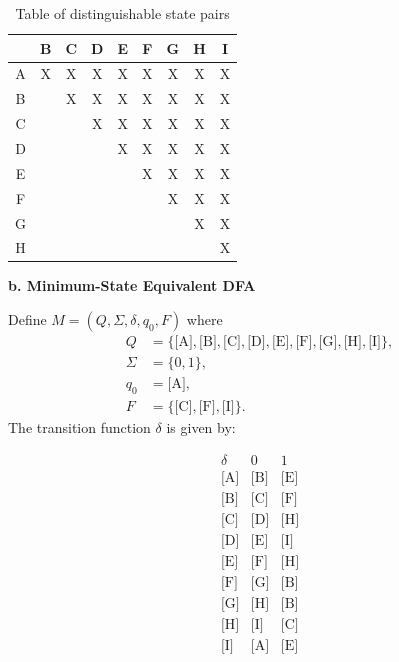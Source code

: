 \documentclass{article}
\theoremstyle{theorem}
\theoremstyle{definition}
\theoremstyle{remark}
\begin{document}
\begin{table}[h]
  \centering
  \begin{tabular}{c|cccccccc}
     & B & C & D & E & F & G & H & I\\ \hline
  A  & X & X & X & X & X & X & X & X\\
  B  &   & X & X & X & X & X & X & X\\
  C  &   &   & X & X & X & X & X & X\\
  D  &   &   &   & X & X & X & X & X\\
  E  &   &   &   &   & X & X & X & X\\
  F  &   &   &   &   &   & X & X & X\\
  G  &   &   &   &   &   &   & X & X\\
  H  &   &   &   &   &   &   &   & X\\
  \end{tabular}
  \caption{Table of distinguishable state pairs}
  \label{tab:distinguishables2}
  \end{table}

\medskip

\textbf{b. Minimum-State Equivalent DFA}

Define \(M = (Q,\Sigma,\delta,q_0,F)\) where
\[
\begin{aligned}
Q      &= \{\text{[A]},\text{[B]},\text{[C]},\text{[D]},\text{[E]},\text{[F]},\text{[G]},\text{[H]},\text{[I]}\},\\
\Sigma &= \{0,1\},\\
q_0    &= \text{[A]},\\
F      &= \{\text{[C]},\text{[F]},\text{[I]}\}.
\end{aligned}
\]
The transition function \(\delta\) is given by:

\[
\begin{array}{c|cc}
\delta      & 0           & 1           \\\hline
\text{[A]} & \text{[B]} & \text{[E]} \\
\text{[B]} & \text{[C]} & \text{[F]} \\
\text{[C]} & \text{[D]} & \text{[H]} \\
\text{[D]} & \text{[E]} & \text{[I]} \\
\text{[E]} & \text{[F]} & \text{[H]} \\
\text{[F]} & \text{[G]} & \text{[B]} \\
\text{[G]} & \text{[H]} & \text{[B]} \\
\text{[H]} & \text{[I]} & \text{[C]} \\
\text{[I]} & \text{[A]} & \text{[E]}
\end{array}
\]
\end{document}
